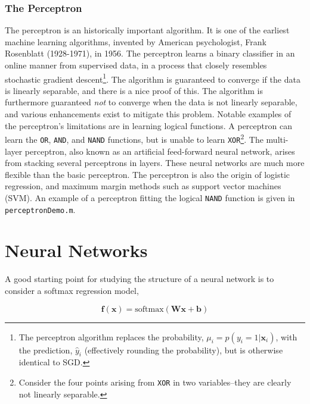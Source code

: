 \documentclass[11pt]{amsart}
\begin{document}
\subsubsection{The Perceptron}
The perceptron is an historically important algorithm. It is one of the earliest machine learning algorithms, invented by American psychologist, Frank Rosenblatt (1928-1971), in 1956. The perceptron learns a binary classifier in an online manner from supervised data, in a process that closely resembles stochastic gradient descent\footnote{The perceptron algorithm replaces the probability, $\mu_i = p(y_i = 1 | \mathbf{x}_i)$, with the prediction, $\hat{y}_i$ (effectively rounding the probability), but is otherwise identical to SGD.}. The algorithm is guaranteed to converge if the data is linearly separable, and there is a nice proof of this. The algorithm is furthermore guaranteed \emph{not} to converge when the data is not linearly separable, and various enhancements exist to mitigate this problem. Notable examples of the perceptron's limitations are in learning logical functions. A perceptron can learn the \texttt{OR}, \texttt{AND}, and \texttt{NAND} functions, but is unable to learn \texttt{XOR}\footnote{Consider the four points arising from \texttt{XOR} in two variables--they are clearly not linearly separable.}. The multi-layer perceptron, also known as an artificial feed-forward neural network, arises from stacking several perceptrons in layers. These neural networks are much more flexible than the basic perceptron. The perceptron is also the origin of logistic regression, and maximum margin methods such as support vector machines (SVM). An example of a perceptron fitting the logical \texttt{NAND} function is given in \texttt{perceptronDemo.m}.

\section{Neural Networks}

A good starting point for studying the structure of a neural network is to consider a softmax regression model,

$$\mathbf{f}(\mathbf{x}) = \text{softmax}(\mathbf{W}\mathbf{x} + \mathbf{b})$$
\end{document}
